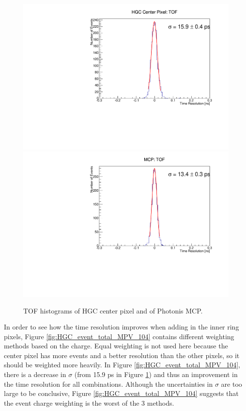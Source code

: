 \documentclass[12pt]{article}
\begin{document}
\begin{figure}%
\centering
	\includegraphics[width=.49\textwidth]{deltaTCenter104.pdf}
	\includegraphics[width=.49\textwidth]{deltaTMCP104.pdf}
	\caption{TOF histograms of HGC center pixel and of Photonis MCP.}
	\label{fig:center_MCP_104}
\end{figure}

In order to see how the time resolution improves when adding in the inner ring pixels, Figure \ref{fig:HGC_event_total_MPV_104} contains different weighting methods based on the charge. 
Equal weighting is not used here because the center pixel has more events and a better resolution than the other pixels, so it should be weighted more heavily. 
In Figure \ref{fig:HGC_event_total_MPV_104}, there is a decrease in $\sigma$ (from 15.9 ps in Figure \ref{fig:center_MCP_104}) and thus an improvement in the time resolution for all combinations. 
Although the uncertainties in $\sigma$ are too large to be conclusive, Figure \ref{fig:HGC_event_total_MPV_104} suggests that the event charge weighting is the worst of the 3 methods.
\end{document}
